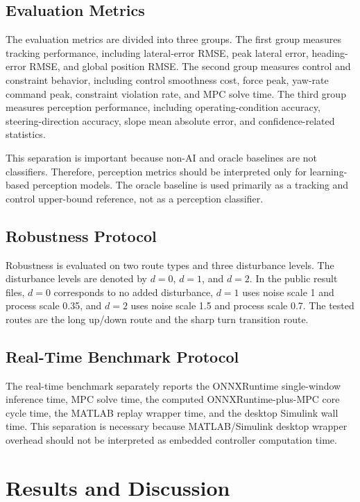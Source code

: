 \documentclass[twocolumn]{article}
\begin{document}
\subsection{Evaluation Metrics}

The evaluation metrics are divided into three groups. The first group measures tracking performance, including lateral-error RMSE, peak lateral error, heading-error RMSE, and global position RMSE. The second group measures control and constraint behavior, including control smoothness cost, force peak, yaw-rate command peak, constraint violation rate, and MPC solve time. The third group measures perception performance, including operating-condition accuracy, steering-direction accuracy, slope mean absolute error, and confidence-related statistics.

This separation is important because non-AI and oracle baselines are not classifiers. Therefore, perception metrics should be interpreted only for learning-based perception models. The oracle baseline is used primarily as a tracking and control upper-bound reference, not as a perception classifier.

\subsection{Robustness Protocol}

Robustness is evaluated on two route types and three disturbance levels. The disturbance levels are denoted by $d=0$, $d=1$, and $d=2$. In the public result files, $d=0$ corresponds to no added disturbance, $d=1$ uses noise scale 1 and process scale 0.35, and $d=2$ uses noise scale 1.5 and process scale 0.7. The tested routes are the long up/down route and the sharp turn transition route.

\subsection{Real-Time Benchmark Protocol}

The real-time benchmark separately reports the ONNXRuntime single-window inference time, MPC solve time, the computed ONNXRuntime-plus-MPC core cycle time, the MATLAB replay wrapper time, and the desktop Simulink wall time. This separation is necessary because MATLAB/Simulink desktop wrapper overhead should not be interpreted as embedded controller computation time.

\section{Results and Discussion}
\end{document}

